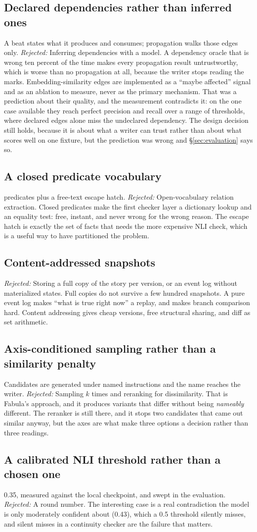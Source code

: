 \documentclass{article}
\newcommand{\decision}[1]{\subsection{#1}}
\newcommand{\rejected}[1]{\textit{Rejected:} #1}
\begin{document}
\decision{Declared dependencies rather than inferred ones}
A beat states what it produces and consumes; propagation walks those edges only.
\rejected{Inferring dependencies with a model.} A dependency oracle that is wrong ten
percent of the time makes every propagation result untrustworthy, which is worse than no
propagation at all, because the writer stops reading the marks. Embedding-similarity edges are
implemented as a ``maybe affected'' signal and as an ablation to measure, never as the
primary mechanism. That was a prediction about their quality, and the measurement contradicts
it: on the one case available they reach perfect precision and recall over a range of
thresholds, where declared edges alone miss the undeclared dependency. The design decision
still holds, because it is about what a writer can trust rather than about what scores well
on one fixture, but the prediction was wrong and \S\ref{sec:evaluation} says so.

\decision{A closed predicate vocabulary}
\rPredicates{} predicates plus a free-text escape hatch. \rejected{Open-vocabulary relation
extraction.} Closed predicates make the first checker layer a dictionary lookup and an
equality test: free, instant, and never wrong for the wrong reason. The escape hatch
is exactly the set of facts that needs the more expensive NLI check, which is a useful
way to have partitioned the problem.

\decision{Content-addressed snapshots}
\rejected{Storing a full copy of the story per version, or an event log without
materialized states.} Full copies do not survive a few hundred snapshots. A pure event
log makes ``what is true right now'' a replay, and makes branch comparison hard.
Content addressing gives cheap versions, free structural sharing, and diff as set
arithmetic.

\decision{Axis-conditioned sampling rather than a similarity penalty}
Candidates are generated under named instructions and the name reaches the writer.
\rejected{Sampling $k$ times and reranking for dissimilarity.} That is Fabula's approach,
and it produces variants that differ without being \emph{nameably} different. The reranker
is still there, and it stops two candidates that came out similar anyway, but the axes are
what make three options a decision rather than three readings.

\decision{A calibrated NLI threshold rather than a chosen one}
0.35, measured against the local checkpoint, and swept in the evaluation.
\rejected{A round number.} The interesting case is a real contradiction the model is only
moderately confident about (0.43), which a 0.5 threshold silently misses, and silent
misses in a continuity checker are the failure that matters.
\end{document}
